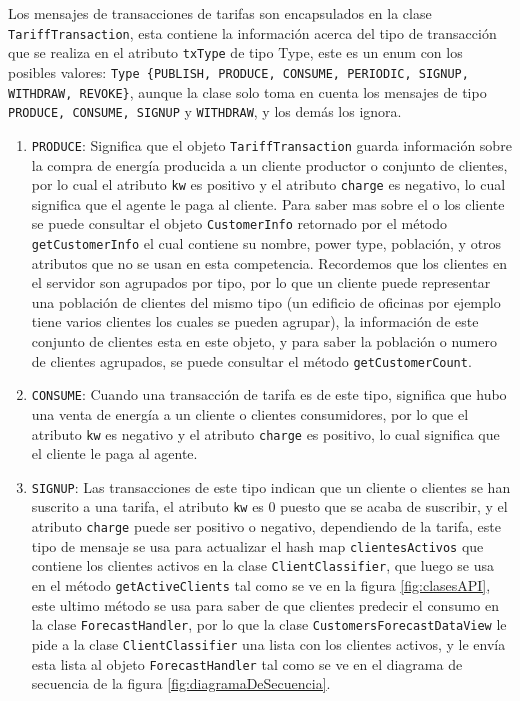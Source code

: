 Los mensajes de transacciones de tarifas son encapsulados en la clase \texttt{TariffTransaction}, esta contiene la información acerca del tipo de transacción que se realiza en el atributo \texttt{txType} de tipo Type, este es un enum con los posibles valores:  \texttt{Type \{PUBLISH, PRODUCE, CONSUME, PERIODIC, SIGNUP, WITHDRAW, REVOKE\}}, aunque la clase solo toma en cuenta los mensajes de tipo \texttt{PRODUCE, CONSUME, SIGNUP} y \texttt{WITHDRAW}, y los demás los ignora.
\renewcommand{\labelenumi}{$\bullet$ }
\begin{enumerate}
	\item \texttt{PRODUCE}: Significa que el objeto \texttt{TariffTransaction} guarda información sobre la compra de energía producida a un cliente productor o conjunto de clientes, por lo cual el atributo \texttt{kw} es positivo y el atributo \texttt{charge} es negativo, lo cual significa que el agente le paga al cliente. Para saber mas sobre el o los cliente se puede consultar el objeto \texttt{CustomerInfo} retornado por el método \texttt{getCustomerInfo} el cual contiene su nombre, power type, población, y otros atributos que no se usan en esta competencia. Recordemos que los clientes en el servidor son agrupados por tipo, por lo que un cliente puede representar una población de clientes del mismo tipo (un edificio de oficinas por ejemplo tiene varios clientes los cuales se pueden agrupar), la información de este conjunto de clientes esta en este objeto, y para saber la población o numero de clientes agrupados, se puede consultar el método \texttt{getCustomerCount}.
	
	 \item \texttt{CONSUME}: Cuando una transacción de tarifa es de este tipo, significa que hubo una venta de energía a un cliente o clientes consumidores,  por lo que el atributo \texttt{kw} es negativo y el atributo \texttt{charge} es positivo, lo cual significa que el cliente le paga al agente.
	
	\item \texttt{SIGNUP}: Las transacciones de este tipo indican que un cliente o clientes se han suscrito a una tarifa, el atributo \texttt{kw}	 es 0 puesto que se acaba de suscribir, y el atributo \texttt{charge} puede ser positivo o negativo, dependiendo de la tarifa, este tipo de mensaje se usa para actualizar el hash map \texttt{clientesActivos} que contiene los clientes activos en la clase \texttt{ClientClassifier}, que luego se usa en el método \texttt{getActiveClients} tal como se ve en la figura \ref{fig:clasesAPI}, este ultimo método se usa para saber de que clientes predecir el consumo en la clase \texttt{ForecastHandler}, por lo que la clase \texttt{CustomersForecastDataView} le pide a la clase \texttt{ClientClassifier} una lista con los clientes activos, y le envía esta lista al objeto \texttt{ForecastHandler} tal como se ve en el diagrama de secuencia de la figura \ref{fig:diagramaDeSecuencia}.
	

\end{enumerate}

